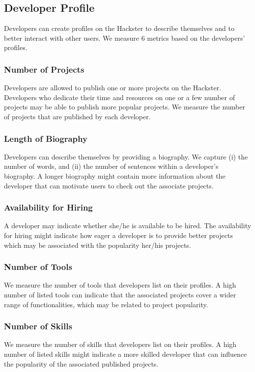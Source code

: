 \subsection{Developer Profile}

Developers can create profiles on the Hackster to describe themselves and to better interact with other users. We measure $6$ metrics based on the developers' profiles.

\subsubsection*{Number of Projects}
Developers are allowed to publish one or more projects on the Hackster.
Developers who dedicate their time and resources on one or a few number of projects may be able to publish more popular projects.
We measure the number of projects that are published by each developer.%

\subsubsection*{Length of Biography}
Developers can describe themselves by providing a biography.
We capture (i) the number of words, and (ii) the number of sentences within a developer's biography. A longer biography might contain more information about the developer that can motivate users to check out the associate projects.

\subsubsection*{Availability for Hiring}
A developer may indicate whether she/he is available to be hired. The availability for hiring might indicate how eager a developer is to provide better projects which may be associated with the popularity her/his projects.

\subsubsection*{Number of Tools}
We measure the number of tools that developers list on their profiles. A high number of listed tools can indicate that the associated projects cover a wider range of functionalities, which may be related to project popularity.

\subsubsection*{Number of Skills}
We measure the number of skills that developers list on their profiles. A high number of listed skills might indicate a more skilled developer that can influence the popularity of the associated published projects.

